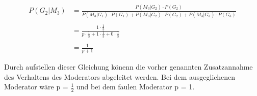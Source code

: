 \begin{equation}
    \begin{split}
        P(G_2 | M_3) & = \frac{P(M_3 | G_2) \cdot P(G_2)}{P(M_3 | G_1) \cdot P(G_1) +
        P(M_3 | G_2) \cdot P(G_2) + P(M_3 | G_3) \cdot P(G_3)} 
        \\
        \\
        & = \frac{1 \cdot \frac{1}{3}}{p \cdot \frac{1}{3} + 1 \cdot \frac{1}{3} + 0 \cdot \frac{1}{3}} 
        \\
        \\
        & = \frac{1}{p+1}
    \end{split}
\end{equation}

Durch aufstellen dieser Gleichung könenn die vorher genannten Zusatzannahme des Verhaltens des Moderators abgeleitet werden.
Bei dem ausgeglichenen Moderator wäre p = $\frac{1}{2}$ und bei dem faulen Moderator p = 1.